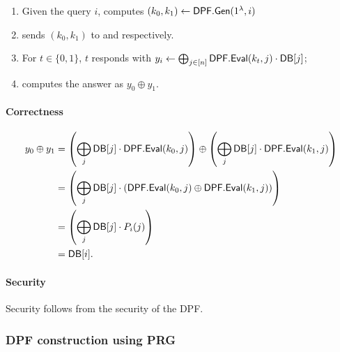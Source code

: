 \begin{enumerate}
    \item Given the query $i$, \Client computes $(k_0,k_1) \leftarrow {\sf DPF}.{\sf Gen}(1^\lambda, i)$
    \item \Client sends $(k_0,k_1)$ to  and  respectively.
    \item For $t\in\{0,1\}$, \Server $t$ responds with $y_i \leftarrow \bigoplus_{j\in [n]} {\sf DPF}.{\sf Eval}(k_t,j)\cdot {\sf DB}[j]$;
    \item \Client computes the answer as $y_0 \oplus y_1$.
\end{enumerate}

\paragraph{Correctness} 
\begin{align*} 
    y_0 \oplus y_1 & = \left(\bigoplus_{j}{\sf DB}[j]\cdot {\sf DPF.Eval}(k_0,j) \right) \oplus \left(\bigoplus_{j}\mathsf{DB}[j]\cdot {\sf DPF}.{\sf Eval}(k_1,j) \right) \\
    & = \left(\bigoplus_{j}{\sf DB}[j]\cdot ({\sf DPF.Eval}(k_0,j)\oplus {\sf DPF}.{\sf Eval}(k_1,j)) \right) \\
    & = \left(\bigoplus_{j}{\sf DB}[j]\cdot P_{i}(j)\right) \\
    & = {\sf DB}[i].
\end{align*}
\paragraph{Security}
Security follows from the security of the DPF.



\subsubsection{DPF construction using PRG}



